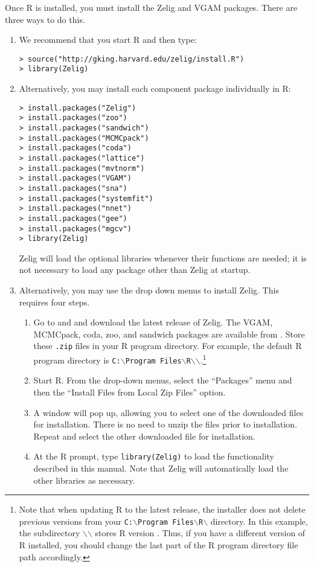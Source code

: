 Once R is installed, you must install the Zelig and VGAM packages.  There
are three ways to do this.  
\begin{enumerate}
\item We recommend that you start R and then type:
\begin{verbatim}
> source("http://gking.harvard.edu/zelig/install.R")
> library(Zelig)
\end{verbatim}
\item Alternatively, you may install each component package individually 
in R:
\begin{verbatim}
> install.packages("Zelig")
> install.packages("zoo")
> install.packages("sandwich")
> install.packages("MCMCpack")
> install.packages("coda")
> install.packages("lattice")
> install.packages("mvtnorm")
> install.packages("VGAM")
> install.packages("sna")
> install.packages("systemfit")
> install.packages("nnet")
> install.packages("gee")
> install.packages("mgcv")
> library(Zelig)
\end{verbatim}
Zelig will load the optional libraries whenever their functions are
needed; it is not necessary to load any package other than Zelig at startup.  

\item \label{manual.windows}Alternatively, you may use the drop down
  menus to install Zelig.  This requires four steps.
\begin{enumerate}
\item \label{win.zelig} Go to  and
  and download the latest release of Zelig.  The VGAM, MCMCpack,
coda, zoo, and sandwich packages are available from
.  Store these
  \texttt{.zip} files in your R program directory.  For example, the
  default R program directory is {\tt C:$\backslash$Program
  Files$\backslash$R$\backslash$\rwvers$\backslash$}.\footnote{Note
  that when updating R to the latest release, the installer does not
  delete previous versions from your {\tt C:$\backslash$Program
  Files$\backslash$R$\backslash$} directory.  In this example, the
  subdirectory {\tt $\backslash$\rwvers$\backslash$} stores R version
  \fullrvers.  Thus, if you have a different version of R installed,
  you should change the last part of the R program directory file path
  accordingly.}
\item Start R.  From the drop-down menus, select the ``Packages'' menu
  and then the ``Install Files from Local Zip Files'' option.
\item A window will pop up, allowing you to select one of the
  downloaded files for installation.  There is no need to unzip the
  files prior to installation.  Repeat and select the other downloaded
  file for installation.
\item At the R prompt, type \texttt{library(Zelig)} to load the
  functionality described in this manual.  Note that Zelig will
  automatically load the other libraries as necessary.
\end{enumerate}


\end{enumerate}

